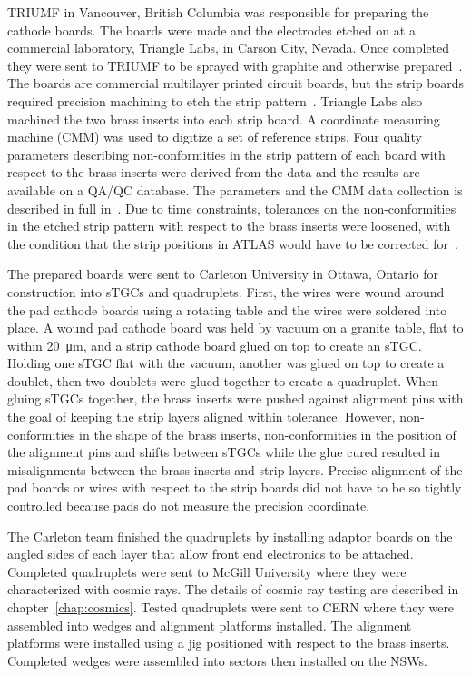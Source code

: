 TRIUMF in Vancouver, British Columbia was responsible for preparing the cathode boards. The boards were made and the electrodes etched on at a commercial laboratory, Triangle Labs, in Carson City, Nevada. Once completed they were sent to TRIUMF to be sprayed with graphite and otherwise prepared~\cite{carlson_results_2019}. The boards are commercial multilayer printed circuit boards, but the strip boards required precision machining to etch the strip pattern~\cite{nsw_tdr}. Triangle Labs also machined the two brass inserts into each strip board. A coordinate measuring machine (CMM) was used to digitize a set of reference strips. Four quality parameters describing non-conformities in the strip pattern of each board with respect to the brass inserts were derived from the data and the results are available on a QA/QC database. The parameters and the CMM data collection is described in full in~\cite{carlson_results_2019}.  Due to time constraints, tolerances on the non-conformities in the etched strip pattern with respect to the brass inserts were loosened, with the condition that the strip positions in ATLAS would have to be corrected for~\cite{carlson_results_2019}. 

The prepared boards were sent to Carleton University in Ottawa, Ontario for construction into sTGCs and quadruplets. First, the wires were wound around the pad cathode boards using a rotating table and the wires were soldered into place. A wound pad cathode board was held by vacuum on a granite table, flat to within \SI{20}{\micro\meter}, and a strip cathode board glued on top to create an sTGC. Holding one sTGC flat with the vacuum, another was glued on top to create a doublet, then two doublets were glued together to create a quadruplet. When gluing sTGCs together, the brass inserts were pushed against alignment pins with the goal of keeping the strip layers aligned within tolerance. However, non-conformities in the shape of the brass inserts, non-conformities in the position of the alignment pins and shifts between sTGCs while the glue cured resulted in misalignments between the brass inserts and strip layers. Precise alignment of the pad boards or wires with respect to the strip boards did not have to be so tightly controlled because pads do not measure the precision coordinate. 

The Carleton team finished the quadruplets by installing adaptor boards on the angled sides of each layer that allow front end electronics to be attached. Completed quadruplets were sent to McGill University where they were characterized with cosmic rays. The details of cosmic ray testing are described in chapter~\ref{chap:cosmics}. Tested quadruplets were sent to CERN where they were assembled into wedges and alignment platforms installed. The alignment platforms were installed using a jig positioned with respect to the brass inserts. Completed wedges were assembled into sectors then installed on the NSWs.

